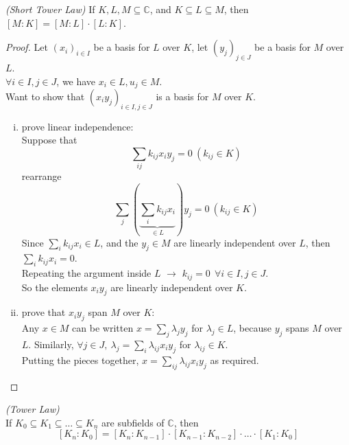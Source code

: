 \documentclass{article}
\theoremstyle{definition}
\newenvironment{thm}[1]
{\renewcommand\theinnerthm{#1}\innerthm}
{\endinnerthm}
\newenvironment{cor}[1]
{\renewcommand\theinnercor{#1}\innercor}
{\endinnercor}
\begin{document}
\begin{thm}{6.4}\emph{(Short Tower Law)}
  If $K, L, M \subseteq \mathbb{C}$, and $K \subseteq L \subseteq M$, then $[M:K]=[M:L]\cdot [L:K]$.
\end{thm}
\begin{proof}
  Let $(x_i)_{i \in I}$ be a basis for $L$ over $K$,
  let $(y_j)_{j \in J}$ be a basis for $M$ over $L$.\\
  $\forall i \in I, j \in J$, we have $x_i \in L, u_j \in M$.
  \\
  Want to show that $(x_i y_j)_{i\in I, j\in J}$ is a basis for $M$ over $K$.
  \begin{enumerate}[i.]
    \item prove linear independence:\\
      Suppose that
      $$\sum_{ij} k_{ij} x_i y_j = 0 ~(k_{ij} \in K)$$
      rearrange
      $$\sum_j (\underbrace{\sum_i k_{ij} x_i}_{\in L}) y_j = 0 ~(k_{ij} \in K)$$
      Since $\sum_i k_{ij} x_i \in L$, and the $y_j \in M$ are linearly independent over $L$, then $\sum_i k_{ij} x_i = 0$.
      \\
      Repeating the argument inside $L$ $\longrightarrow$ $k_{ij}=0 ~~\forall i\in I, j\in J$.
      \\
      So the elements $x_i y_j$ are linearly independent over $K$.

    \item prove that $x_i y_j$ span $M$ over $K$:\\
      Any $x \in M$ can be written $x=\sum_j \lambda_j y_j$ for $\lambda_j \in L$, because $y_j$ spans $M$ over $L$.
      Similarly, $\forall j\in J,~ \lambda_j = \sum_i \lambda_{ij} x_i y_j$ for  $\lambda_{ij} \in K$.\\
      Putting the pieces together, $x=\sum_{ij} \lambda_{ij} x_i y_j$ as required.
  \end{enumerate}
\end{proof}

\begin{cor}{6.6}\emph{(Tower Law)}\\
  If $K_0 \subseteq K_1 \subseteq \ldots \subseteq K_n$ are subfields of $\mathbb{C}$, then
  $$[K_n:K_0] = [K_n:K_{n-1}] \cdot [K_{n-1}:K_{n-2}] \cdot \ldots \cdot [K_1: K_0]$$
\end{cor}



\end{document}
